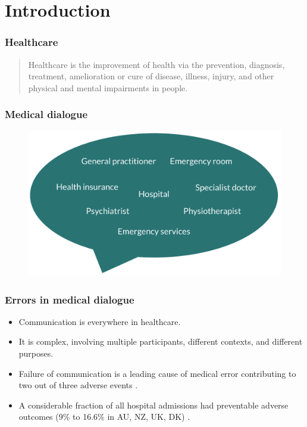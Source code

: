 
\section{Introduction}


\begin{frame}
    \frametitle{Healthcare}
    \begin{quotation}
        \noindent\centering
        Healthcare is the improvement of health via the {\color{dtured}prevention}, {\color{dtured}diagnosis}, {\color{dtured}treatment}, {\color{dtured}amelioration} or {\color{dtured}cure} of {\color{theme-green}disease}, {\color{theme-green}illness}, {\color{theme-green}injury}, and {\color{theme-green}other physical and mental impairments} in people.
    \end{quotation}
\end{frame}


\begin{frame}
    \frametitle{Medical dialogue}
    \begin{figure}
        \centering
        \includegraphics[width=0.7\paperwidth]{figures/speech_bubble.pdf}
    \end{figure}

\end{frame}


\begin{frame}
    \frametitle{Errors in medical dialogue}
    \begin{itemize}
        \item<1,2>Communication is everywhere in healthcare. 
        \item <1,2>It is complex, involving multiple participants, different contexts, and different purposes.
        \item <2> {\color{dtured} } Failure of communication is a leading cause of medical error contributing to two out of three adverse events \cite{starmer_changes_2014}.
        \item <2> A considerable fraction of all hospital admissions had preventable adverse outcomes (9\% to 16.6\% in AU, NZ, UK, DK) \cite{carver_medical_2024}.
    \end{itemize}
\end{frame}


